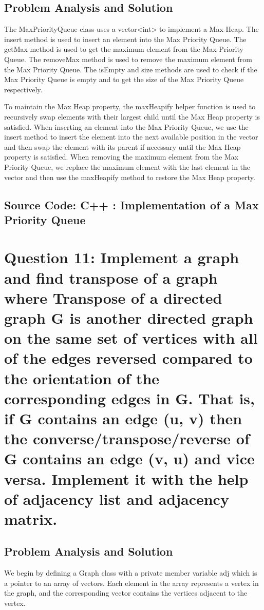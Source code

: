 \documentclass[a4paper]{article}
\begin{document}
\subsection{Problem Analysis and Solution}
The MaxPriorityQueue class uses a vector<int> to implement a Max Heap. The insert method is used to insert an element into the Max Priority Queue. The getMax method is used to get the maximum element from the Max Priority Queue. The removeMax method is used to remove the maximum element from the Max Priority Queue. The isEmpty and size methods are used to check if the Max Priority Queue is empty and to get the size of the Max Priority Queue respectively.

To maintain the Max Heap property, the maxHeapify helper function is used to recursively swap elements with their largest child until the Max Heap property is satisfied. When inserting an element into the Max Priority Queue, we use the insert method to insert the element into the next available position in the vector and then swap the element with its parent if necessary until the Max Heap property is satisfied. When removing the maximum element from the Max Priority Queue, we replace the maximum element with the last element in the vector and then use the maxHeapify method to restore the Max Heap property.

\subsection{Source Code: C++ : Implementation of a Max Priority Queue}

\pagebreak




\section{\hspace{-0.5em}\textbf{ Question 11}: Implement a graph and find transpose of a graph where Transpose of a directed graph G is another directed graph on the same set of vertices with all of the edges reversed compared to the orientation of the corresponding edges in G. That is, if G contains an edge (u, v) then the converse/transpose/reverse of G contains an edge (v, u) and vice versa. Implement it with the help of adjacency list and adjacency matrix.}

\subsection{Problem Analysis and Solution}
We begin by defining a Graph class with a private member variable adj which is a pointer to an array of vectors. Each element in the array represents a vertex in the graph, and the corresponding vector contains the vertices adjacent to the vertex.
\end{document}
